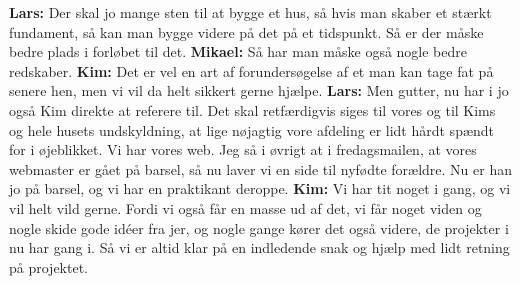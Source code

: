 \textbf{Lars:} Der skal jo mange sten til at bygge et hus, så hvis man skaber et stærkt fundament, så kan man bygge videre på det på et tidspunkt. Så er der måske bedre plads i forløbet til det. \newline
\textbf{Mikael:} Så har man måske også nogle bedre redskaber. \newline
\textbf{Kim:} Det er vel en art af forundersøgelse af et man kan tage fat på senere hen, men vi vil da helt sikkert gerne hjælpe. \newline
\textbf{Lars:} Men gutter, nu har i jo også Kim direkte at referere til. Det skal retfærdigvis siges til vores og til Kims og hele husets undskyldning, at lige nøjagtig vore afdeling er lidt hårdt spændt for i øjeblikket. Vi har vores web. Jeg så i øvrigt at i fredagsmailen, at vores webmaster er gået på barsel, så nu laver vi en side til nyfødte forældre. Nu er han jo på barsel, og vi har en praktikant deroppe. \newline
\textbf{Kim:} Vi har tit noget i gang, og vi vil helt vild gerne. Fordi vi også får en masse ud af det, vi får noget viden og nogle skide gode idéer fra jer, og nogle gange kører det også videre, de projekter i nu har gang i. Så vi er altid klar på en indledende snak og hjælp med lidt retning på projektet. \newline
